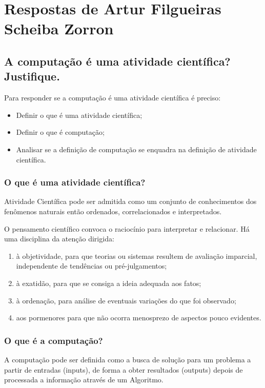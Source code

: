 \section{Respostas de Artur Filgueiras Scheiba Zorron \label{tarefa-CaioMassucato-componentes-eperimento}}

\subsection{A computação é uma atividade científica? Justifique. }

Para responder se a computação é uma atividade científica é preciso:
\begin{itemize}
    \item Definir o que é uma atividade científica;
    \item Definir o que é computação;
    \item Analisar se a definição de computação se enquadra na definição de atividade científica. 
\end{itemize}

\subsubsection{O que é uma atividade científica?} Atividade Científica pode ser admitida como um conjunto de conhecimentos dos fenômenos naturais então ordenados, correlacionados e interpretados. 

O pensamento científico convoca o raciocínio para interpretar e relacionar. Há uma disciplina da atenção dirigida:

\begin{enumerate}
    \item à objetividade, para que teorias ou sistemas resultem de avaliação imparcial, independente de tendências ou pré-julgamentos;
    \item  à exatidão, para que se consiga a ideia adequada aos fatos;
    \item  à ordenação, para análise de eventuais variações do que foi observado;
    \item aos pormenores para que não ocorra menosprezo de aspectos pouco evidentes.
\end{enumerate}

\subsubsection{O que é a computação?}

A computação pode ser definida como a busca de solução para um problema a partir de entradas (inputs), de forma a obter resultados (outputs) depois de processada a informação através de um \gls{Algoritmo}.

